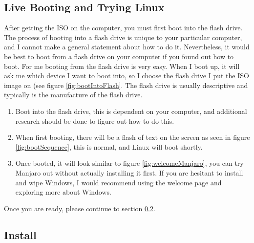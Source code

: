 \documentclass{article}
\begin{document}
\subsection{Live Booting and Trying Linux}\label{liveboot}
After getting the ISO on the computer, you must first boot into the flash drive. The process of booting into a flash drive is unique to your particular computer, and I cannot make a general statement about how to do it. Nevertheless, it would be best to boot from a flash drive on your computer if you found out how to boot. For me booting from the flash drive is very easy. When I boot up, it will ask me which device I want to boot into, so I choose the flash drive I put the ISO image on (see figure \ref{fig:bootIntoFlash}. The flash drive is usually descriptive and typically is the manufacture of the flash drive. 
\begin{enumerate}
    \item Boot into the flash drive, this is dependent on your computer, and additional research should be done to figure out how to do this.
    \item When first booting, there will be a flash of text on the screen as seen in figure \ref{fig:bootSequence}, this is normal, and Linux will boot shortly.
    \item Once booted, it will look similar to figure \ref{fig:welcomeManjaro}, you can try Manjaro out without actually installing it first. If you are hesitant to install and wipe Windows, I would recommend using the welcome page and exploring more about Windows. 
\end{enumerate}
Once you are ready, please continue to section \ref{install}.

\subsection{Install}\label{install}
\end{document}

